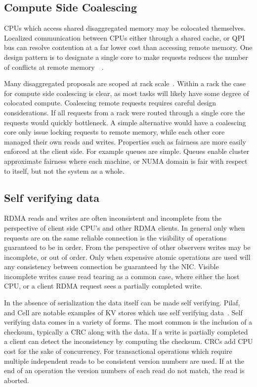 \subsection{Compute Side Coalescing}
CPUs which access shared disaggregated memory may be colocated themselves.
Localized communication between CPUs either through a shared cache, or QPI bus
can resolve contention at a far lower cost than accessing remote memory.
One design pattern is to designate a single core to make requests reduces the
number of conflicts at remote memory~\cite{flat-combine}~\cite{sherman}. 

Many disaggregated proposals are scoped at rack scale~\cite{disandapp}. Within a
rack the case for compute side coalescing is clear, as most tasks will likely
have some degree of colocated compute. Coalescing remote requests requires
careful design considerations. If all requests from a rack were routed through a
single core the requests would quickly bottleneck. A simple alternative would
have a coalescing core only issue locking requests to remote memory, while each
other core managed their own reads and writes.  Properties such as fairness are
more easily enforced at the client side. For example queues are simple. Queues
enable cluster approximate fairness where each machine, or NUMA domain is fair
with respect to itself, but not the system as a whole.

\subsection{Self verifying data} 
RDMA reads and writes are often inconsistent and incomplete from the perspective
of client side CPU's and other RDMA clients. In general only when requests are
on the same reliable connection is the visibility of operations guaranteed to be
in order. From the perspective of other observers writes may be incomplete, or
out of order. Only when expensive atomic operations are used will any
consistency between connection be guaranteed by the NIC. Visible incomplete
writes cause read tearing as a common case, where either the host CPU, or a
client RDMA request sees a partially completed write. 

In the absence of serialization the data itself can be made self verifying.
Pilaf, and Cell are notable examples of KV stores which use self verifying
data~\cite{pilaf,cell}. Self verifying data comes in a variety of forms. The
most common is the inclusion of a checksum, typically a CRC along with the data.
If a write is partially completed a client can detect the inconsistency by
computing the checksum. CRCs add CPU cost for the sake of concurrency. For
transactional operations which require multiple independent reads to be
consistent version numbers are used. If at the end of an operation the version
numbers of each read do not match, the read is aborted.


